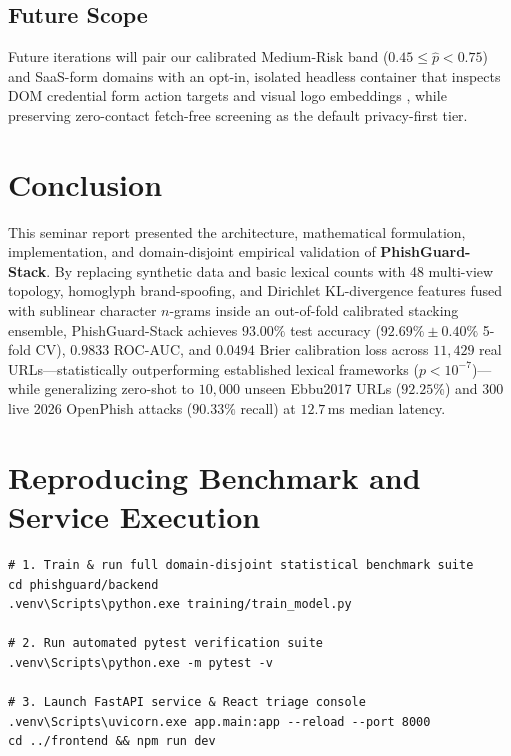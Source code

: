 \documentclass[12pt,a4paper]{report}
\begin{document}
\section{Future Scope}
Future iterations will pair our calibrated Medium-Risk band ($0.45 \le \hat{p} < 0.75$) and SaaS-form domains with an opt-in, isolated headless container that inspects DOM credential form action targets \cite{xiang2011} and visual logo embeddings \cite{abdelnabi2020}, while preserving zero-contact fetch-free screening as the default privacy-first tier.

\chapter{Conclusion}
This seminar report presented the architecture, mathematical formulation, implementation, and domain-disjoint empirical validation of \textbf{PhishGuard-Stack}. By replacing synthetic data and basic lexical counts with 48 multi-view topology, homoglyph brand-spoofing, and Dirichlet KL-divergence features fused with sublinear character $n$-grams inside an out-of-fold calibrated stacking ensemble, PhishGuard-Stack achieves $93.00\%$ test accuracy ($92.69\% \pm 0.40\%$ 5-fold CV), $0.9833$ ROC-AUC, and $0.0494$ Brier calibration loss across $11{,}429$ real URLs---statistically outperforming established lexical frameworks ($p < 10^{-7}$)---while generalizing zero-shot to $10{,}000$ unseen Ebbu2017 URLs ($92.25\%$) and $300$ live 2026 OpenPhish attacks ($90.33\%$ recall) at $12.7$\,ms median latency.

\appendix
\chapter{Reproducing Benchmark and Service Execution}
\begin{lstlisting}
# 1. Train & run full domain-disjoint statistical benchmark suite
cd phishguard/backend
.venv\Scripts\python.exe training/train_model.py

# 2. Run automated pytest verification suite
.venv\Scripts\python.exe -m pytest -v

# 3. Launch FastAPI service & React triage console
.venv\Scripts\uvicorn.exe app.main:app --reload --port 8000
cd ../frontend && npm run dev
\end{lstlisting}
\end{document}

